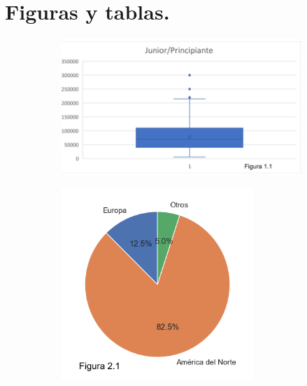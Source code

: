 \documentclass{article}
\begin{document}
	\section*{Figuras y tablas.}		
	\begin{figure}[htbp] %
		\centering
		\begin{subfigure}[b]{1.1\textwidth}
			\includegraphics[width=\textwidth]{FigurasTablas/figura1.1diagrama}
			\label{figura 1.1 diagrama}
		\end{subfigure}
		\begin{subfigure}[b]{1.1\textwidth}
			\includegraphics[width=0.8\textwidth]{FigurasTablas/figura2.1graficotorta.png}
			\label{figura2.1 torta}
		\end{subfigure}	
	\end{figure}
\end{document}
